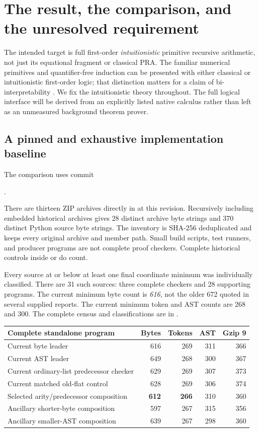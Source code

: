 \section{The result, the comparison, and the unresolved requirement}
\label{sec:result}

The intended target is full first-order \emph{intuitionistic} primitive
recursive arithmetic, not just its equational fragment or classical PRA.
The familiar numerical primitives and quantifier-free induction can be
presented with either classical or intuitionistic first-order logic;
that distinction matters for a claim of bi-interpretability
\cite{avigad,moschovakis}. We fix the intuitionistic theory throughout.
The full logical interface will be derived from an explicitly listed
native calculus rather than left as an unmeasured background theorem prover.

\subsection{A pinned and exhaustive implementation baseline}

The comparison uses commit
\begin{center}\small
{}.
\end{center}
There are thirteen ZIP archives directly in  at this
revision. Recursively including embedded historical archives gives 28
distinct archive byte strings and 370 distinct Python source byte strings.
The inventory is SHA-256 deduplicated and keeps every original archive
and member path. Small build scripts, test runners, and producer programs
are not complete proof checkers. Complete historical controls inside
 or  do count.

Every source at or below at least one final coordinate minimum was
individually classified. There are 31 such sources: three complete
checkers and 28 supporting programs. The current minimum byte count is
\emph{616}, not the older 672 quoted in several supplied reports. The
current minimum token and AST counts are 268 and 300. The complete
census and classifications are in .

\begin{center}\small
\begin{tabular}{lrrrr}
\toprule
Complete standalone program & Bytes & Tokens & AST & Gzip 9\\
\midrule
Current byte leader &616&269&311&366\\
Current AST leader &649&268&300&367\\
Current ordinary-list predecessor checker &629&269&307&373\\
Current matched old-flat control &628&269&306&374\\
\midrule
Selected arity/predecessor composition &\textbf{612}&\textbf{266}&310&360\\
Ancillary shorter-byte composition &597&267&315&356\\
Ancillary smaller-AST composition &639&267&298&360\\
\bottomrule
\end{tabular}
\end{center}

